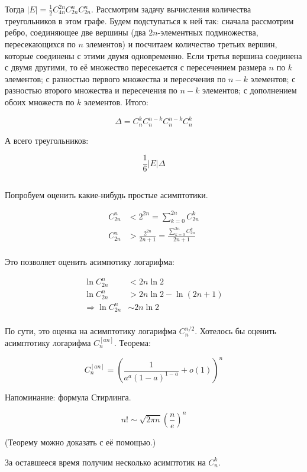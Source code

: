 \documentclass[12pt]{article}
\begin{document}
Тогда $|E| = \frac 1 2 C^{2n}_{4n} C^n_{2n} C^n_{2n}$. Рассмотрим задачу вычисления количества треугольников в этом графе. Будем подступаться к ней так: сначала рассмотрим ребро, соединяющее две вершины (два $2n$-элементных подмножества, пересекающихся по $n$ элементов) и посчитаем количество третьих вершин, которые соединены с этими двумя одновременно. Если третья вершина соединена с двумя другими, то её множество пересекается с пересечением размера $n$ по $k$ элементов; с разностью первого множества и пересечения по $n-k$ элементов; с разностью второго множества и пересечения по $n-k$ элементов; с дополнением обоих множеств по $k$ элементов. Итого:

\[ \Delta = C_n^k C_n^{n-k} C_n^{n-k} C_n^k \]

А всего треугольников:

\[ \frac 1 6 |E| \Delta \]

\subsection{}

Попробуем оценить какие-нибудь простые асимптотики.

\begin{align*}
C^n_{2n} &< 2^{2n} = \sum_{k=0}^{2n} C^k_{2n} \\
C^n_{2n} &> \frac {2^{2n}} {2n + 1} = \frac {\sum_{k=0}^{2n} C^k_{2n}} {2n + 1} \\
\end{align*}

Это позволяет оценить асимпотику логарифма:

\begin{align*}
\ln C^n_{2n} &< 2n \ln 2 \\
\ln C^n_{2n} &> 2n \ln 2 - \ln(2n + 1) \\
\Rightarrow \ln C^n_{2n} &\sim 2n \ln 2 \\
\end{align*}

По сути, это оценка на асимптотику логарифма $C^{n/2}_n$. Хотелось бы оценить асимптотику логарифма $C^{[an]}_n$. Теорема:

\[ C^{[an]}_n = \left( \frac 1 {a^a (1-a)^{1-a}} + o(1) \right)^n \]

Напоминание: формула Стирлинга.

\[ n! \sim \sqrt{2 \pi n} \left( \frac n e \right)^n \]

(Теорему можно доказать с её помощью.)

За оставшееся время получим несколько асимптотик на $C^k_n$.
\end{document}

